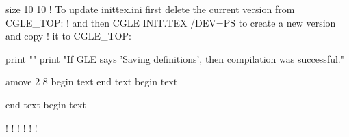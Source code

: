 size 10 10
! To update inittex.ini first delete the current version from CGLE_TOP:
! and then  CGLE INIT.TEX /DEV=PS to create a new version and copy
! it to CGLE_TOP:

print ""
print "If GLE says 'Saving definitions', then compilation was successful."

amove 2 8
begin text
      
    
    
    
end text
begin text
\mathcode{[}{$405B}
\mathcode{]}{$505D}

end text
begin text
\delcode{[}{$05B302}
\delcode{]}{$05D303}

\def\lbrack{[} \def\rbrack{]}
\def\space{ }

\def\,{\movexy{0.5em}{0}}
\def\:{\movexy{1em}{0}}
\def\;{\movexy{2em}{0}}
\def\!{\movexy{-0.5em}{0}}

\def\smallskip{\vskip{2 ex}}            %
\def\medskip{\vskip{4 ex}}              %
\def\bigskip{\vskip{8 ex}}              %

\def\ss{\char{$19}}
\def\ae{\char{$1A}}
\def\oe{\char{$1b}}
\def\o{\char{$1c}}
\def\AE{\char{$1d}}
\def\OE{\char{$1e}}
\def\O{\char{$1f}}

!\def\ae{\uchr{00E6}}
!\def\oe{\uchr{0153}}
!\def\o{\uchr{00F8}}
!\def\AE{\uchr{00C6}}
!\def\OE{\uchr{0152}}
!\def\O{\uchr{00D8}}

\def\i{\char{$10}}
\def\j{\char{$11}}
\def\l{{\fontenc{1}{rm}\char{248}}}
\def\L{{\fontenc{1}{rm}\char{232}}}

\def\adobess{\char{251}}
\def\adobeae{\char{241}}
\def\adobeoe{\char{250}}
\def\adobeAE{\char{225}}
\def\adobeOE{\char{234}}
\def\adobeo{\char{249}}
\def\adobeO{\char{233}}
\def\adobei{\char{245}}
\def\adobesterlin{\char{163}}
\def\adobeyen{\char{165}}
\def\adobeflorin{\char{166}}
\def\adobesection{\char{167}}
\def\adobecurrency{\char{168}}

